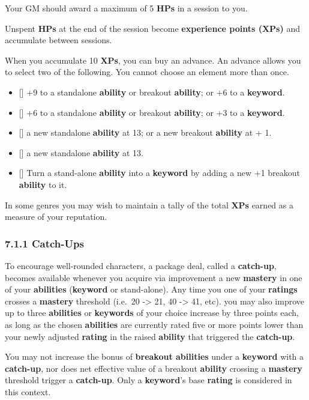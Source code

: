 \documentclass[
]{article}
\providecommand{\tightlist}{%
  \setlength{\itemsep}{0pt}\setlength{\parskip}{0pt}}
\begin{document}
Your GM should award a maximum of 5 \textbf{HPs} in a session to you.

Unspent \textbf{HPs} at the end of the session become \textbf{experience
points (XPs)} and accumulate between sessions.

When you accumulate 10 \textbf{XPs}, you can buy an advance. An advance
allows you to select two of the following. You cannot choose an element
more than once.

\begin{itemize}
\tightlist
\item
  {[}{]} +9 to a standalone \textbf{ability} or breakout
  \textbf{ability}; or +6 to a \textbf{keyword}.
\item
  {[}{]} +6 to a standalone \textbf{ability} or breakout
  \textbf{ability}; or +3 to a \textbf{keyword}.
\item
  {[}{]} a new standalone \textbf{ability} at 13; or a new breakout
  \textbf{ability} at + 1.
\item
  {[}{]} a new standalone \textbf{ability} at 13.
\item
  {[}{]} Turn a stand-alone \textbf{ability} into a \textbf{keyword} by
  adding a new +1 breakout \textbf{ability} to it.
\end{itemize}

In some genres you may wish to maintain a tally of the total
\textbf{XPs} earned as a measure of your reputation.

\hypertarget{catch-ups}{%
\subsubsection{7.1.1 Catch-Ups}\label{catch-ups}}

To encourage well-rounded characters, a package deal, called a
\textbf{catch-up}, becomes available whenever you acquire via
improvement a new \textbf{mastery} in one of your \textbf{abilities}
(\textbf{keyword} or stand-alone). Any time you one of your
\textbf{ratings} crosses a \textbf{mastery} threshold (i.e.~20
-\textgreater{} 21, 40 -\textgreater{} 41, etc). you may also improve up
to three \textbf{abilities} or \textbf{keywords} of your choice increase
by three points each, as long as the chosen \textbf{abilities} are
currently rated five or more points lower than your newly adjusted
\textbf{rating} in the raised \textbf{ability} that triggered the
\textbf{catch-up}.

You may not increase the bonus of \textbf{breakout abilities} under a
\textbf{keyword} with a \textbf{catch-up}, nor does net effective value
of a breakout \textbf{ability} crossing a \textbf{mastery} threshold
trigger a \textbf{catch-up}. Only a \textbf{keyword}'s base
\textbf{rating} is considered in this context.
\end{document}
